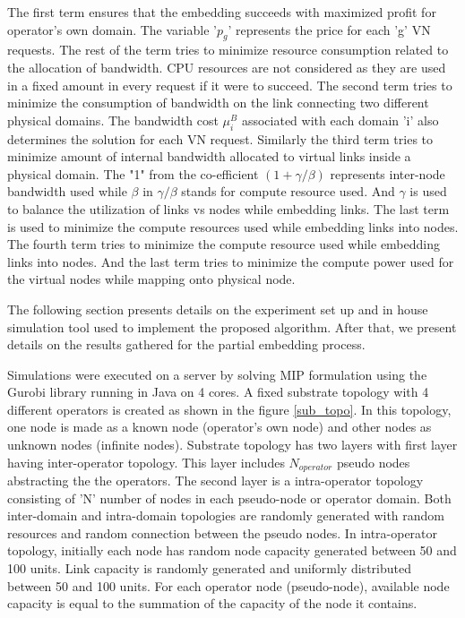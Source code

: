 \documentclass[article,dr=phil,type=msc ,colorback,accentcolor=tud4b]{tudthesis}
\begin{document}
\hspace*{2cm} The first term ensures that the embedding succeeds with maximized profit for operator's own domain. The variable '$p_{g}$' represents the price for each 'g' VN requests. The rest of the term tries to minimize resource consumption related to the allocation of bandwidth. CPU resources are not considered as they are used in a fixed amount in every request if it were to succeed. The second term tries to minimize the consumption of bandwidth on the link connecting two different physical domains. The bandwidth cost $\mu_{i}^{B}$ associated with each domain 'i' also determines the solution for each VN request. Similarly the third term tries to minimize amount of internal bandwidth allocated to virtual links inside a physical domain. The "1" from the co-efficient $(1+\gamma/\beta)$ represents inter-node bandwidth used while $\beta$ in $\gamma/\beta$ stands for compute resource used. And $\gamma$ is used to balance the utilization of links vs nodes while embedding links. The last term is used to minimize the compute
resources used while embedding links into nodes. The fourth term tries to minimize the compute resource used while embedding links into nodes. And the last term tries to minimize the compute power used for the virtual nodes while mapping onto physical node.\newline

The following section presents details on the experiment set up and in house simulation tool used to implement the proposed algorithm. After that, we present details on the results gathered for the partial embedding process. \newline

Simulations were executed on a server by solving MIP formulation using the Gurobi library running in Java on 4 cores. A fixed substrate topology with 4 different operators is created as shown in the figure \ref{sub_topo}. In this topology, one node is made as a known node (operator's own node) and other nodes as unknown nodes (infinite nodes). Substrate topology has two layers with first layer having inter-operator topology. This layer includes $N_{operator}$ pseudo nodes abstracting the the operators. The second layer is a intra-operator topology consisting of 'N' number of nodes in each pseudo-node or operator domain. Both inter-domain and intra-domain topologies are randomly generated with random resources and random connection between the pseudo nodes. In intra-operator topology, initially each node has random node capacity generated between 50 and 100 units. Link capacity is randomly generated and uniformly distributed between 50 and 100 units. For each operator node (pseudo-node), available node capacity is equal to the summation of the capacity of the node it contains. \newline
\end{document}
